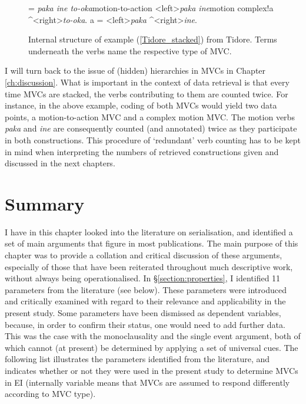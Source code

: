 \begin{figure}[h]
\jtree[xunit=8em]
\! = {\textit{paka ine to-oka}}{motion-to-action}
<left>{\textit{paka ine}}{motion complex}!a ^<right>{\textit{to-oka}}.
\!a = <left>{\textit{paka}} ^<right>{\textit{ine}}.
\endjtree


\caption[Internal structure of example (\ref{Tidore_stacked}) from Tidore]{Internal structure of example (\ref{Tidore_stacked}) from Tidore. Terms underneath the verbs name the respective type of MVC.}
\label{figure:tidoreMVC}
\end{figure}

I will turn back to the issue of (hidden) hierarchies in MVCs in Chapter \ref{ch:discussion}. What is important in the context of data retrieval is that every time MVCs are stacked, the verbs contributing to them are counted twice. For instance, in the above example, coding of both MVCs would yield two data points, a motion-to-action MVC and a complex motion MVC. The motion verbs \textit{paka} and \textit{ine} are consequently counted (and annotated) twice as they participate in both constructions. This procedure of `redundant' verb counting has to be kept in mind when interpreting the numbers of retrieved constructions given and discussed in the next chapters.

\section{Summary}

I have in this chapter looked into the literature on serialisation, and identified a set of main arguments that figure in most publications. The main purpose of this chapter was to provide a collation and critical discussion of these arguments, especially of those that have been reiterated throughout much descriptive work, without always being operationalised. In §\ref{section:properties}, I identified 11 parameters from the literature (see below). These parameters were introduced and critically examined with regard to their relevance and applicability in the present study. Some parameters have been dismissed as dependent variables, because, in order to confirm their status, one would need to add further data. This was the case with the monoclausality and the single event argument, both of which cannot (at present) be determined by applying a set of universal cues. The following list illustrates the parameters identified from the literature, and indicates whether or not they were used in the present study to determine MVCs in EI (internally variable means that MVCs are assumed to respond differently according to MVC type).

